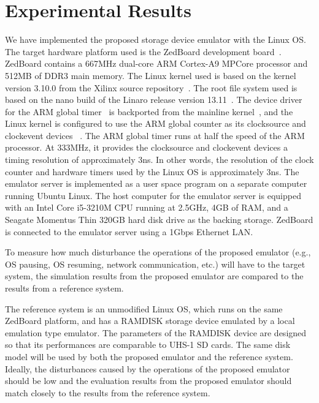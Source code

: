 \section{Experimental Results}
\label{sec:ch6-6.6}

We have implemented the proposed storage device emulator with the Linux OS. The target hardware platform used is the ZedBoard development board~\cite{ZedBoard:2014}. ZedBoard contains a 667MHz dual-core ARM Cortex-A9 MPCore processor and 512MB of DDR3 main memory. The Linux kernel used is based on the kernel version 3.10.0 from the Xilinx source repository~\cite{Xilinx:2014:kernel}. The root file system used is based on the nano build of the Linaro release version 13.11~\cite{Linaro:2014:v13.11nano}. The device driver for the ARM global timer~\cite{Xilinx:2013:Zynq7010} is backported from the mainline kernel~\cite{Kernel:2013:ARMglobalTimer}, and the Linux kernel is configured to use the ARM global counter as its clocksource and clockevent devices~\cite{Stultz:2005} \cite{GleixnerNiehaus:2006} \cite{GleixnerMolnar:2006} \cite{Gleixner:2007}. The ARM global timer runs at half the speed of the ARM processor. At 333MHz, it provides the clocksource and clockevent devices a timing resolution of approximately 3\si{\nano\second}. In other words, the resolution of the clock counter and hardware timers used by the Linux OS is approximately 3\si{\nano\second}. The emulator server is implemented as a user space program on a separate computer running Ubuntu Linux. The host computer for the emulator server is equipped with an Intel Core i5-3210M CPU running at 2.5GHz, 4GB of RAM, and a Seagate Momentus Thin 320GB hard disk drive as the backing storage. ZedBoard is connected to the emulator server using a 1Gbps Ethernet LAN. 

To measure how much disturbance the operations of the proposed emulator (e.g., OS pausing, OS resuming, network communication, etc.) will have to the target system, the simulation results from the proposed emulator are compared to the results from a reference system.

The reference system is an unmodified Linux OS, which runs on the same ZedBoard platform, and has a RAMDISK storage device emulated by a local emulation type emulator. The parameters of the RAMDISK device are designed so that its performances are comparable to UHS-1 SD cards. The same disk model will be used by both the proposed emulator and the reference system. Ideally, the disturbances caused by the operations of the proposed emulator should be low and the evaluation results from the proposed emulator should match closely to the results from the reference system.

